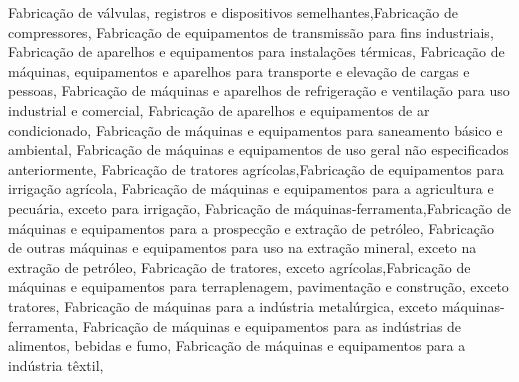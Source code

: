 \documentclass[
  12,
  dvipsnames]{article}
\newenvironment{Shaded}{\begin{snugshade}}{\end{snugshade}}
\newcommand{\NormalTok}[1]{#1}
\newcommand{\StringTok}[1]{\textcolor[rgb]{0.31,0.60,0.02}{#1}}
\begin{document}
\begin{Shaded}
\begin{Highlighting}[]
    \StringTok{\textquotesingle{}Fabricação de válvulas, registros e dispositivos semelhantes\textquotesingle{}}\NormalTok{,}\StringTok{\textquotesingle{}Fabricação de compressores\textquotesingle{}}\NormalTok{,}
    \StringTok{\textquotesingle{}Fabricação de equipamentos de transmissão para fins industriais\textquotesingle{}}\NormalTok{,}
    \StringTok{\textquotesingle{}Fabricação de aparelhos e equipamentos para instalações térmicas\textquotesingle{}}\NormalTok{,}
    \StringTok{\textquotesingle{}Fabricação de máquinas, equipamentos e aparelhos para transporte e elevação de cargas e pessoas\textquotesingle{}}\NormalTok{,}
    \StringTok{\textquotesingle{}Fabricação de máquinas e aparelhos de refrigeração e ventilação para uso industrial e comercial\textquotesingle{}}\NormalTok{,}
    \StringTok{\textquotesingle{}Fabricação de aparelhos e equipamentos de ar condicionado\textquotesingle{}}\NormalTok{,}
    \StringTok{\textquotesingle{}Fabricação de máquinas e equipamentos para saneamento básico e ambiental\textquotesingle{}}\NormalTok{,}
    \StringTok{\textquotesingle{}Fabricação de máquinas e equipamentos de uso geral não especificados anteriormente\textquotesingle{}}\NormalTok{,}
    \StringTok{\textquotesingle{}Fabricação de tratores agrícolas\textquotesingle{}}\NormalTok{,}\StringTok{\textquotesingle{}Fabricação de equipamentos para irrigação agrícola\textquotesingle{}}\NormalTok{,}
    \StringTok{\textquotesingle{}Fabricação de máquinas e equipamentos para a agricultura e pecuária, exceto para irrigação\textquotesingle{}}\NormalTok{,}
    \StringTok{\textquotesingle{}Fabricação de máquinas{-}ferramenta\textquotesingle{}}\NormalTok{,}\StringTok{\textquotesingle{}Fabricação de máquinas e equipamentos para a prospecção e extração de petróleo\textquotesingle{}}\NormalTok{,}
    \StringTok{\textquotesingle{}Fabricação de outras máquinas e equipamentos para uso na extração mineral, exceto na extração de petróleo\textquotesingle{}}\NormalTok{,}
    \StringTok{\textquotesingle{}Fabricação de tratores, exceto agrícolas\textquotesingle{}}\NormalTok{,}\StringTok{\textquotesingle{}Fabricação de máquinas e equipamentos para terraplenagem, pavimentação e construção, exceto tratores\textquotesingle{}}\NormalTok{,}
    \StringTok{\textquotesingle{}Fabricação de máquinas para a indústria metalúrgica, exceto máquinas{-}ferramenta\textquotesingle{}}\NormalTok{,}
    \StringTok{\textquotesingle{}Fabricação de máquinas e equipamentos para as indústrias de alimentos, bebidas e fumo\textquotesingle{}}\NormalTok{,}
    \StringTok{\textquotesingle{}Fabricação de máquinas e equipamentos para a indústria têxtil\textquotesingle{}}\NormalTok{,}

\end{Highlighting}
\end{Shaded}
\end{document}
